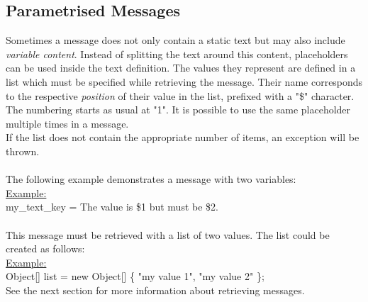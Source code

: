   \subsection{Parametrised Messages}
  Sometimes a message does not only contain a static text but may also include \textit{variable content}.
  Instead of splitting the text around this content, placeholders can be used inside the text definition.
  The values they represent are defined in a list which must be specified while retrieving the message.
  Their name corresponds to the respective \textit{position} of their value in the list, prefixed with
  a "\$" character. The numbering starts as usual at "1". It is possible to use the same placeholder 
  multiple times in a message.\\
  If the list does not contain the appropriate number of items, an exception will be thrown.\\\\
  The following example demonstrates a message with two variables:\\
  \underline{Example:}\\
  {\small\ttfamily
    \indent my\_text\_key = The value is \$1 but must be \$2.\\
  }\\
  This message must be retrieved with a list of two values. The list could be created as follows:\\
  \underline{Example:}\\
  {\small\ttfamily
    \indent Object[] list = new Object[] \{ "my value 1", "my value 2" \};\\
  }
  See the next section for more information about retrieving messages.
  
